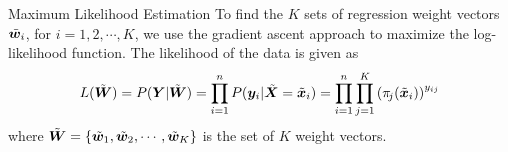 \begin{frame}{Maximum Likelihood Estimation}
%
To find the $K$ sets of regression weight vectors $\tilde{{\boldsymbol w}}_i$, for
$i=1,2,\cdots, K$, we use the gradient ascent approach to
maximize the log-likelihood function. 
The likelihood of the data is given as
\begin{align*}
    L(\tilde{{\boldsymbol W}}) = P({\boldsymbol Y}|\tilde{{\boldsymbol W}}) =
    \prod_{i=1}^n P({\boldsymbol y}_i | \tilde{{\boldsymbol X}}=\tilde{{\boldsymbol x}}_i) = 
    \prod_{i=1}^n \prod_{j=1}^{K} \left(\pi_{\!j}(\tilde{{\boldsymbol x}}_i)\right)^{y_{ij}}
\end{align*}
where $\tilde{{\boldsymbol W}} = \{\tilde{{\boldsymbol w}}_1, \tilde{{\boldsymbol w}}_2, \cdots, \tilde{{\boldsymbol w}}_K\}$ is the set of $K$
weight vectors.

\medskip


\end{frame}
